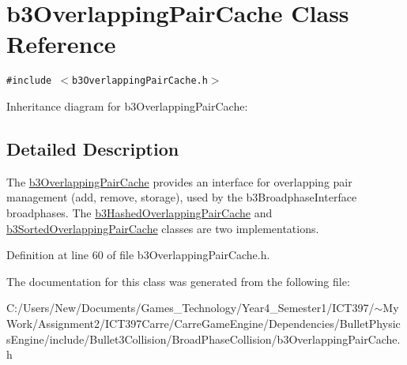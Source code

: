 \hypertarget{classb3_overlapping_pair_cache}{
\section{b3OverlappingPairCache Class Reference}
\label{classb3_overlapping_pair_cache}
}
{\tt \#include $<$b3OverlappingPairCache.h$>$}

Inheritance diagram for b3OverlappingPairCache:

\subsection{Detailed Description}
The \hyperlink{classb3_overlapping_pair_cache}{b3OverlappingPairCache} provides an interface for overlapping pair management (add, remove, storage), used by the b3BroadphaseInterface broadphases. The \hyperlink{classb3_hashed_overlapping_pair_cache}{b3HashedOverlappingPairCache} and \hyperlink{classb3_sorted_overlapping_pair_cache}{b3SortedOverlappingPairCache} classes are two implementations. 

Definition at line 60 of file b3OverlappingPairCache.h.

The documentation for this class was generated from the following file:\begin{CompactItemize}
\item 
C:/Users/New/Documents/Games\_\-Technology/Year4\_\-Semester1/ICT397/$\sim$My Work/Assignment2/ICT397Carre/CarreGameEngine/Dependencies/BulletPhysicsEngine/include/Bullet3Collision/BroadPhaseCollision/b3OverlappingPairCache.h\end{CompactItemize}
